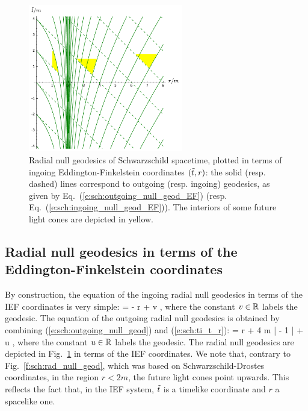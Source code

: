 \begin{figure}
\centerline{\includegraphics[width=0.6\textwidth]{sch_rad_null_geod_EF.pdf}}
\caption[]{\label{f:sch:rad_null_geod_EF} \footnotesize
Radial null geodesics of Schwarzschild spacetime, plotted in terms
of ingoing Eddington-Finkelstein coordinates $({\tilde t},r)$: the solid (resp. dashed) lines
correspond to outgoing (resp. ingoing) geodesics, as given by Eq.~(\ref{e:sch:outgoing_null_geod_EF})
(resp. Eq.~(\ref{e:sch:ingoing_null_geod_EF})). The interiors of some future light
cones are depicted in yellow.}
\end{figure}

\subsection{Radial null geodesics in terms of the Eddington-Finkelstein coordinates}

By construction, the equation of the ingoing radial null geodesics
in terms of the IEF coordinates is very simple:
\be \label{e:sch:ingoing_null_geod_EF}
    \ti = - r + v ,
\ee
where the constant $v\in \mathbb{R}$ labels the geodesic.
The equation of the outgoing radial null geodesics is obtained
by combining (\ref{e:sch:outgoing_null_geod}) and (\ref{e:sch:ti_t_r}):
\be \label{e:sch:outgoing_null_geod_EF}
    \ti = r + 4 m \ln \left|  - 1 \right| + u ,
\ee
where the constant $u\in \mathbb{R}$ labels the geodesic.
The radial null geodesics are depicted in Fig.~\ref{f:sch:rad_null_geod_EF}
in terms of the IEF coordinates. We note that, contrary to Fig.~\ref{f:sch:rad_null_geod},
which was based on Schwarzschild-Drostes coordinates, in the region $r<2m$,
the future light cones point upwards. This reflects the fact that, in the IEF system,
${\tilde t}$ is a timelike coordinate and $r$ a spacelike one.

